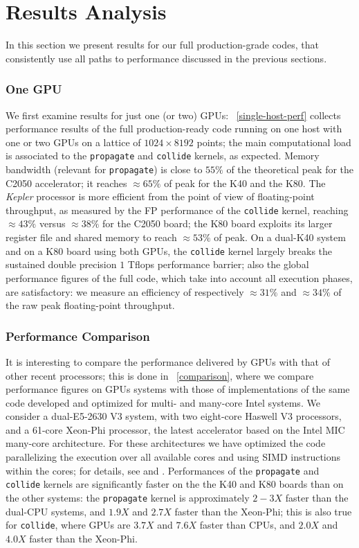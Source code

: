 \documentclass{elsarticle}
\begin{document}
\section{Results Analysis}

In this section we present results for our full production-grade codes, 
that consistently use all paths to performance discussed 
in the previous sections. 

\subsubsection*{One GPU}

We first examine results for just one (or two) GPUs: \tablename~\ref{single-host-perf} 
collects performance results of the full production-ready code running on one host with 
one or two GPUs on a lattice of $1024 \times 8192$ points; the main
computational load is associated to the {\tt propagate} and {\tt collide}
kernels, as expected. 
%
Memory bandwidth (relevant for {\tt propagate}) is close to $55\%$ of 
the theoretical peak for the C2050 accelerator; it reaches $\approx 65\%$ 
of peak for the K40 and the K80.
% 
The {\em Kepler} processor is more efficient from the point of view of floating-point 
throughput, as measured by the FP performance of the {\tt collide} 
kernel, reaching $\approx 43\%$ versus $\approx 38\%$ for the C2050 board; the 
K80 board exploits its larger register 
file and shared memory to reach $\approx 53\%$ of peak.
% 
On a dual-K40 system and on a K80 board using both GPUs, the {\tt collide} kernel 
largely breaks the sustained double precision $1$ Tflops performance barrier;
also the global performance figures of the full code, which take into account all 
execution phases, are satisfactory: we measure an efficiency of respectively 
$\approx 31\%$ and $\approx 34\%$ of the raw peak floating-point throughput.  

\subsubsection*{Performance Comparison}

It is interesting to compare the performance delivered by GPUs with that 
of other recent processors; this is done in \tablename~\ref{comparison}, 
where we compare performance figures on GPUs systems with those of implementations 
of the same code developed and optimized for multi- and many-core 
Intel systems. 
%
We consider a dual-E5-2630 V3 system, with two eight-core Haswell V3 processors, 
and a 61-core Xeon-Phi processor, the latest accelerator based on the 
Intel MIC many-core architecture. For these architectures we have optimized 
the code parallelizing the execution over all available cores and 
using SIMD instructions within the cores; for details, see \cite{caf13,ccp12} and \cite{iccs13,chep13}. 
%
Performances of the {\tt propagate} and 
{\tt collide} kernels are significantly faster on the the K40 and K80 boards than on the other systems:
%
the {\tt propagate} kernel is approximately $2-3X$ faster than the dual-CPU systems,  
and $1.9X$ and $2.7X$ faster than the Xeon-Phi; 
%
this is also true for {\tt collide}, where GPUs are $3.7X$ and $7.6X$ 
faster than CPUs, and $2.0X$ and $4.0X$ faster than the Xeon-Phi.
\end{document}
